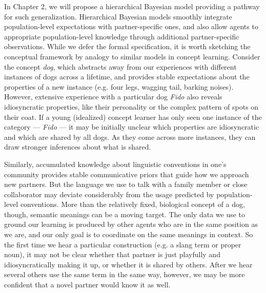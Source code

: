 In Chapter 2, we will propose a hierarchical Bayesian model providing a pathway for such generalization.
Hierarchical Bayesian models smoothly integrate population-level expectations with partner-specific ones, and also allow agents to appropriate population-level knowledge through additional partner-specific observations.
While we defer the formal specification, it is worth sketching the conceptual framework by analogy to similar models in concept learning.
Consider the concept \emph{dog}, which abstracts away from our experiences with different instances of dogs across a lifetime, and provides stable expectations about the properties of a new instance (e.g. four legs, wagging tail, barking noises).
However, extensive experience with a particular dog \emph{Fido} also reveals idiosyncratic properties, like their personality or the complex pattern of spots on their coat.
If a young (idealized) concept learner has only seen one instance of the category --- \emph{Fido} --- it may be initially unclear which properties are idiosyncratic and which are shared by all dogs.
As they come across more instances, they can draw stronger inferences about what is shared.

Similarly, accumulated knowledge about linguistic conventions in one's community provides stable communicative priors that guide how we approach new partners. 
But the language we use to talk with a family member or close collaborator may deviate considerably from the usage predicted by population-level conventions.
More than the relatively fixed, biological concept of a dog, though, semantic meanings can be a moving target. 
The only data we use to ground our learning is produced by other agents who are in the same position as we are, and our only goal is to coordinate on the same meanings in context. 
So the first time we hear a particular construction (e.g. a slang term or proper noun), it may not be clear whether that partner is just playfully and idiosyncratically making it up, or whether it is shared by others.
After we hear several others use the same term in the same way, however, we may be more confident that a novel partner would know it as well.

